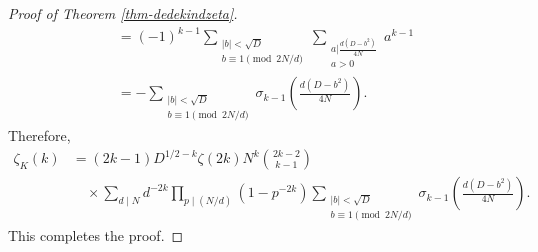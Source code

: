 \documentclass[12pt]{amsart}
\numberwithin{equation}{section}
\theoremstyle{definition}
\begin{document}
\begin{proof}[Proof of Theorem \ref{thm-dedekindzeta}]
\begin{align*}
    &=(-1)^{k-1}\sum\limits_{\substack{|b|<\sqrt{D} \\ b\equiv 1\pmod{2N/d}}}\sum\limits_{\substack{a \big| \frac{d(D-b^{2})}{4N} \\ a>0}}a^{k-1}\\
    &=-\sum\limits_{\substack{|b|<\sqrt{D} \\ b\equiv 1\pmod{2N/d}}}\sigma_{k-1}\left(\frac{d(D-b^{2})}{4N}\right).
\end{align*}
Therefore,
\begin{align*}
    \zeta_{K}(k)
    &=(2k-1)D^{1/2-k}\zeta(2k)N^{k}\binom{2k-2}{k-1}\\
    &\quad\times\sum_{d\mid N}d^{-2k}\prod_{p\mid(N/d)}(1-p^{-2k})
    \sum\limits_{\substack{|b|<\sqrt{D} \\ b\equiv 1\pmod{2N/d}}}\sigma_{k-1}\left(\frac{d(D-b^{2})}{4N}\right).
\end{align*}
This completes the proof.
\end{proof}
\end{document}
